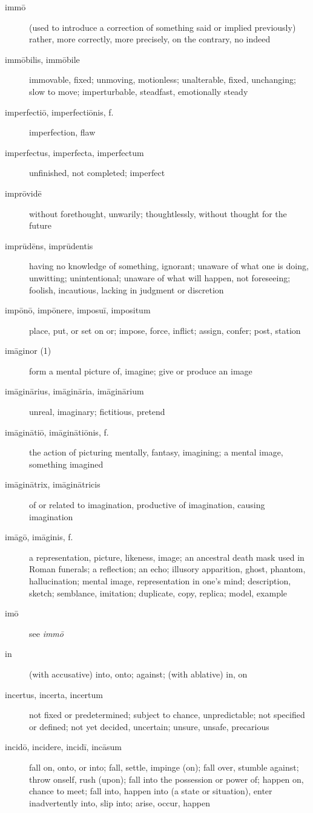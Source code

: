 \begin{description}
    \item[immō] (used to introduce a correction of something said or implied previously) rather, more correctly, more precisely, on the contrary, no indeed
    \item[immōbilis, immōbile] immovable, fixed; unmoving, motionless; unalterable, fixed, unchanging; slow to move; imperturbable, steadfast, emotionally steady
    \item[imperfectiō, imperfectiōnis, f.] imperfection, flaw
    \item[imperfectus, imperfecta, imperfectum] unfinished, not completed; imperfect
    \item[imprōvidē] without forethought, unwarily; thoughtlessly, without thought for the future
    \item[imprūdēns, imprūdentis] having no knowledge of something, ignorant; unaware of what one is doing, unwitting; unintentional; unaware of what will happen, not foreseeing; foolish, incautious, lacking in judgment or discretion
    \item[impōnō, impōnere, imposuī, impositum] place, put, or set on or; impose, force, inflict; assign, confer; post, station
    \item[imāginor (1)] form a mental picture of, imagine; give or produce an image
    \item[imāginārius, imāgināria, imāginārium] unreal, imaginary; fictitious, pretend
    \item[imāginātiō, imāginātiōnis, f.] the action of picturing mentally, fantasy, imagining; a mental image, something imagined
    \item[imāginātrix, imāginātricis] of or related to imagination, productive of imagination, causing imagination
    \item[imāgō, imāginis, f.] a representation, picture, likeness, image; an ancestral death mask used in Roman funerals; a reflection; an echo; illusory apparition, ghost, phantom, hallucination; mental image, representation in one's mind; description, sketch; semblance, imitation; duplicate, copy, replica; model, example
    \item[imō] see \textit{immō}
    \item[in] (with accusative) into, onto; against; (with ablative) in, on
    \item[incertus, incerta, incertum] not fixed or predetermined; subject to chance, unpredictable; not specified or defined; not yet decided, uncertain; unsure, unsafe, precarious
    \item[incidō, incidere, incidī, incāsum] fall on, onto, or into; fall, settle, impinge (on); fall over, stumble against; throw onself, rush (upon); fall into the possession or power of; happen on, chance to meet; fall into, happen into (a state or situation), enter inadvertently into, slip into; arise, occur, happen

\end{description}
